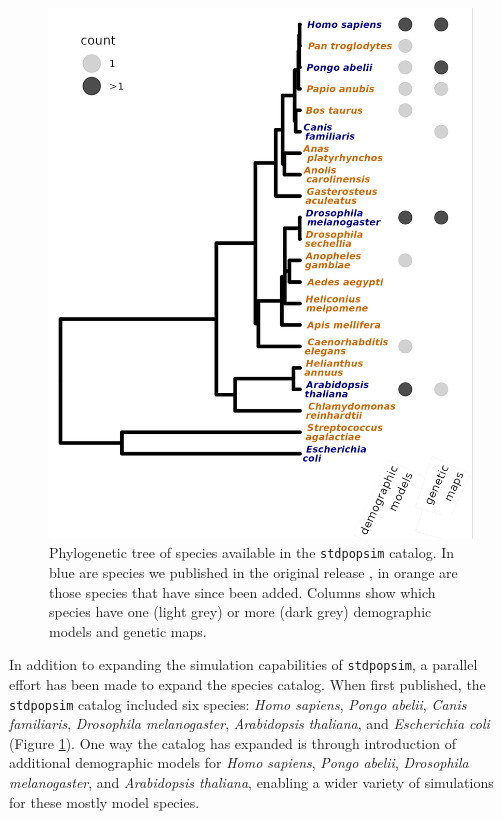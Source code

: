 \documentclass[hidelinks]{article}
\newcommand{\stdpopsim}{\texttt{stdpopsim}\xspace}
\begin{document}
\begin{figure}
    \includegraphics[width=\linewidth]{figs/species_fig}
	\caption{Phylogenetic tree of species available in the \stdpopsim catalog.
		In blue are species we published in the original release \citep{Adrion2020}, in orange are those 
		species that have since been added. Columns show which species have one (light grey) or more
		(dark grey) demographic models and genetic maps.
	\label{fig:tree} }
\end{figure}


In addition to expanding the simulation capabilities of \stdpopsim,
a parallel effort has been made to expand the species catalog.
When first published, the \stdpopsim catalog included six species:
\emph{Homo sapiens}, \emph{Pongo abelii}, \emph{Canis familiaris}, \emph{Drosophila melanogaster},
\emph{Arabidopsis thaliana}, and \emph{Escherichia coli} (Figure \ref{fig:tree}).
One way the catalog has expanded is through introduction of additional demographic models
for \emph{Homo sapiens}, \emph{Pongo abelii}, \emph{Drosophila melanogaster},
and \emph{Arabidopsis thaliana}, enabling a wider variety of simulations for these
mostly model species.
\end{document}
